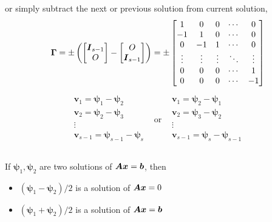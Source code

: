 \documentclass{overview}
\begin{document}
or simply subtract the next or previous solution from current solution,
\[
\boldsymbol{\Gamma}
=\pm \left( \begin{bmatrix} \boldsymbol{I}_{s-1} \\ O \\ \end{bmatrix}
-
\begin{bmatrix} O \\ \boldsymbol{I}_{s-1} \\ \end{bmatrix} \right)
=\pm\begin{bmatrix}
	1 & 0 & 0 & \cdots & 0 \\
	-1 & 1 & 0 & \cdots & 0\\
	0 & -1 & 1 & \cdots & 0\\
	\vdots & \vdots & \vdots & \ddots & \vdots \\
	0 & 0 & 0 & \cdots & 1 \\
	0 & 0 & 0 & \cdots & -1 \\
\end{bmatrix}
\] 
\[
	\begin{array}{ccc}
		\begin{array}{c}
			\boldsymbol{v}_1 = \boldsymbol{\psi}_1 - \boldsymbol{\psi}_2 \\
			\boldsymbol{v}_2 = \boldsymbol{\psi}_2 - \boldsymbol{\psi}_3 \\
			\vdots \\
			\boldsymbol{v}_{s-1} = \boldsymbol{\psi}_{s-1} - \boldsymbol{\psi}_{s} \\
		\end{array} & \text{or} &
		\begin{array}{c}
			\boldsymbol{v}_1 = \boldsymbol{\psi}_2 - \boldsymbol{\psi}_1 \\
			\boldsymbol{v}_2 = \boldsymbol{\psi}_3 - \boldsymbol{\psi}_2 \\
			\vdots \\
			\boldsymbol{v}_{s-1} = \boldsymbol{\psi}_{s} - \boldsymbol{\psi}_{s-1} \\
		\end{array} \\
	\end{array}
\] 

\begin{example}
If $\boldsymbol{\psi}_1, \boldsymbol{\psi}_2$ are two solutions
of $\boldsymbol{A} \boldsymbol{x}=\boldsymbol{b}$, then
\begin{itemize}
	\item $(\boldsymbol{\psi}_1 - \boldsymbol{\psi}_2)/2$ is a solution of $\boldsymbol{A} \boldsymbol{x}=0$
	\item $(\boldsymbol{\psi}_1 + \boldsymbol{\psi}_2)/2$ is a solution of $\boldsymbol{A} \boldsymbol{x}=\boldsymbol{b}$
\end{itemize}
\end{example}
\end{document}
